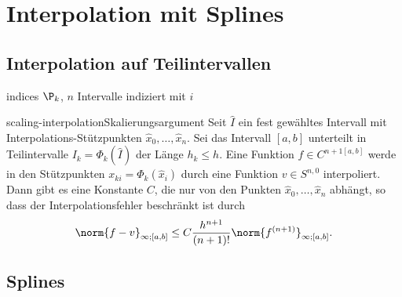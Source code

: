 \section{Interpolation mit Splines}

\subsection{Interpolation auf Teilintervallen}

\begin{Notation}{indices}
  $\P_k$, $n$ Intervalle indiziert mit $i$
\end{Notation}

\begin{Lemma*}{scaling-interpolation}{Skalierungsargument}
  Seit $\hat I$ ein fest gewähltes Intervall mit
  Interpolations-Stützpunkten $\hat x_0,\dots,\hat x_n$. Sei das
  Intervall $[a,b]$ unterteilt in Teilintervalle
  $I_k = \Phi_k(\hat I)$ der Länge $h_k \le h$. Eine Funktion
  $f\in C^{n+1[a,b]}$ werde in den Stützpunkten
  $x_{ki} = \Phi_k(\hat x_i)$ durch eine Funktion $v\in S^{n,0}$
  interpoliert.  Dann gibt es eine Konstante $C$, die nur von den
  Punkten $\hat x_0,\dots,\hat x_n$ abhängt, so dass der
  Interpolationsfehler beschränkt ist durch
  \begin{gather}
    \norm{f-v}_{\infty;[a,b]}
    \le C \frac{h^{n+1}}{(n+1)!} \norm{f^{(n+1)}}_{\infty;[a,b]}.
  \end{gather}
\end{Lemma*}


\subsection{Splines}
